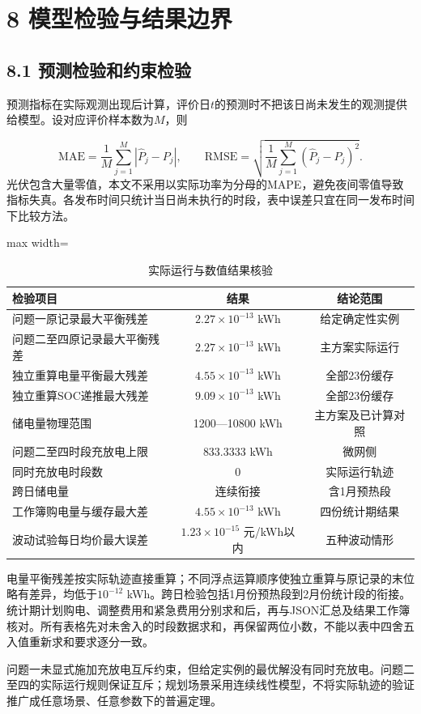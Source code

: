 \documentclass[UTF8,a4paper,zihao=-4,fontset=windows]{ctexart}
\begin{document}
\section{8 模型检验与结果边界}
\subsection{8.1 预测检验和约束检验}
预测指标在实际观测出现后计算，评价日$t$的预测时不把该日尚未发生的观测提供给模型。设对应评价样本数为$M$，则
\par
\begin{equation}
\mathrm{MAE}=\frac1M\sum_{j=1}^M|\widehat P_j-P_j|,\qquad
\mathrm{RMSE}=\sqrt{\frac1M\sum_{j=1}^M(\widehat P_j-P_j)^2}. \tag{20}
\end{equation}
光伏包含大量零值，本文不采用以实际功率为分母的MAPE，避免夜间零值导致指标失真。各发布时间只统计当日尚未执行的时段，表中误差只宜在同一发布时间下比较方法。
\par
\begin{table}[H]\centering\caption{实际运行与数值结果核验}
\fontsize{9.5}{12}\selectfont\setlength{\tabcolsep}{4pt}\renewcommand{\arraystretch}{1.12}
\begin{adjustbox}{max width=\linewidth}\begin{tabular}{lcc}\toprule
检验项目 & 结果 & 结论范围\\\midrule
问题一原记录最大平衡残差 & $2.27\times10^{-13}$ kWh & 给定确定性实例\\
问题二至四原记录最大平衡残差 & $2.27\times10^{-13}$ kWh & 主方案实际运行\\
独立重算电量平衡最大残差 & $4.55\times10^{-13}$ kWh & 全部23份缓存\\
独立重算SOC递推最大残差 & $9.09\times10^{-13}$ kWh & 全部23份缓存\\
储电量物理范围 & 1200—10800 kWh & 主方案及已计算对照\\
问题二至四时段充放电上限 & 833.3333 kWh & 微网侧\\
同时充放电时段数 & 0 & 实际运行轨迹\\
跨日储电量 & 连续衔接 & 含1月预热段\\
工作簿购电量与缓存最大差 & $4.55\times10^{-13}$ kWh & 四份统计期结果\\
波动试验每日均价最大误差 & $1.23\times10^{-15}$ 元/kWh以内 & 五种波动情形\\
\bottomrule\end{tabular}\end{adjustbox}\end{table}
电量平衡残差按实际轨迹直接重算；不同浮点运算顺序使独立重算与原记录的末位略有差异，均低于$10^{-12}$ kWh。跨日检验包括1月份预热段到2月份统计段的衔接。统计期计划购电、调整费用和紧急费用分别求和后，再与JSON汇总及结果工作簿核对。所有表格先对未舍入的时段数据求和，再保留两位小数，不能以表中四舍五入值重新求和要求逐分一致。
\par
问题一未显式施加充放电互斥约束，但给定实例的最优解没有同时充放电。问题二至四的实际运行规则保证互斥；规划场景采用连续线性模型，不将实际轨迹的验证推广成任意场景、任意参数下的普遍定理。
\par
\end{document}
